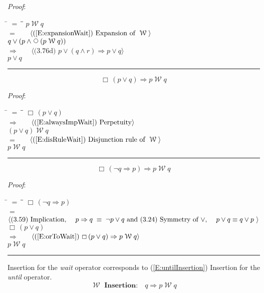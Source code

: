 \documentclass[12pt, fleqn, leqno]{article}
\newcommand{\lgap}{2pt}                             %
\newcommand{\mymathindent}{24pt}                    %
\newcommand{\equivs}{\ensuremath{\;\equiv\;}}       %
\newcommand{\impl}{\ensuremath{\Rightarrow}}        %
\newcommand{\Wait}{\;\mathcal{W}\;}
\newcommand{\Next}{\;\,\text{\raisebox{3.5pt}{\circle{6}}}}
\newcommand{\Always}{\Box\,}
\newcommand{\myqed}{\rule[-.23ex]{1.2ex}{2.0ex}}
\newcommand{\myqedtab}{\hspace{384pt}}              %
\newcommand{\Gll} {\langle}                         %
\newcommand{\Ggg} {\rangle}                         %
\newcommand{\Hint}[1]     {\ \ \ $\Gll              \mbox{#1} \Ggg$ }   %
\begin{document}
\emph{Proof}:
\begin{tabbing}
\hspace{\mymathindent} \= $= \;$ \= \myqedtab \= \kill
\> \> $p \Wait q$\\[\lgap]
\> $=$ \> \Hint{(\ref{E:expansionWait}) Expansion of $\Wait$} \\[\lgap]
\> \> $q \lor (p \land \Next(p \Wait q))$\\[\lgap]
\> $\impl$ \> \Hint{(3.76d) $p\lor (q\land r) \impl p\lor q$} \\[\lgap]
\> \> $p \lor q$ \quad \myqed
\end{tabbing}

\begin{equation}\label{E:orToWait}
\Always (p\lor q) \impl p \Wait q
\end{equation}

\emph{Proof}:
\begin{tabbing}
\hspace{\mymathindent} \= $= \;$ \= \myqedtab \= \kill
\> \> $\Always (p\lor q)$\\[\lgap]
\> $\impl$ \> \Hint{(\ref{E:alwaysImpWait}) Perpetuity} \\[\lgap]
\> \> $(p\lor q)\Wait q$\\[\lgap]
\> $=$ \> \Hint{(\ref{E:disRuleWait}) Disjunction rule of $\Wait$} \\[\lgap]
\> \> $p \Wait q$ \quad \myqed
\end{tabbing}

\begin{equation}\label{E:notqimpliespToWait}
\Always (\neg q \impl p) \impl p \Wait q
\end{equation}

\emph{Proof}:
\begin{tabbing}
\hspace{\mymathindent} \= $= \;$ \= \myqedtab \= \kill
\> \> $\Always (\neg q \impl p)$\\[\lgap]
\> $=$ \> \Hint{(3.59) Implication, \quad $p\impl q \equivs \neg p \lor q$ and (3.24) Symmetry of $\lor$, \quad $p\lor q \equiv q\lor p$ } \\[\lgap]
\> \> $\Always (p \lor q)$\\[\lgap]
\> $\impl$ \> \Hint{(\ref{E:orToWait}) $\Always (p\lor q) \impl p \Wait q$} \\[\lgap]
\> \> $p \Wait q$ \quad \myqed
\end{tabbing}


Insertion for the \textit{wait} operator corresponds to
(\ref{E:untilInsertion}) Insertion for the \textit{until} operator.
\begin{equation}\label{E:waitInsertion}
\textbf{$\Wait$ Insertion:}\quad q \impl p \Wait q
\end{equation}
\end{document}
